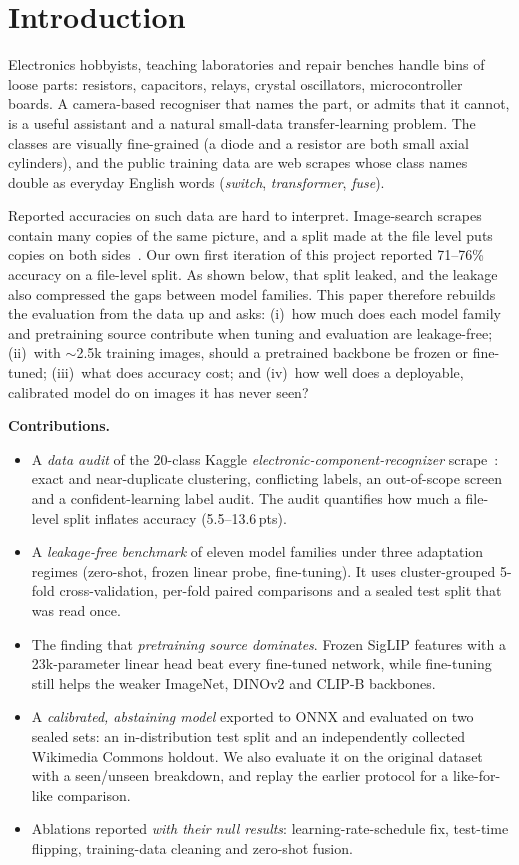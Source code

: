\documentclass[conference]{IEEEtran}
\newcommand{\pts}{\,pts}
\begin{document}
\section{Introduction}
Electronics hobbyists, teaching laboratories and repair benches handle bins of loose parts: resistors, capacitors,
relays, crystal oscillators, microcontroller boards. A camera-based recogniser that names the part, or admits that it
cannot, is a useful assistant and a natural small-data transfer-learning problem. The classes are visually
fine-grained (a diode and a resistor are both small axial cylinders), and the public training data are web scrapes
whose class names double as everyday English words (\emph{switch}, \emph{transformer}, \emph{fuse}).

Reported accuracies on such data are hard to interpret. Image-search scrapes contain many copies of the same picture,
and a split made at the file level puts copies on both sides~\cite{barz2020cifair,kapoor2023leakage}. Our own first
iteration of this project reported 71--76\% accuracy on a file-level split. As shown below, that split leaked, and the
leakage also compressed the gaps between model families. This paper therefore rebuilds the evaluation from the data up
and asks: (i)~how much does each model family and pretraining source contribute when tuning and evaluation are
leakage-free; (ii)~with ${\sim}$2.5k training images, should a pretrained backbone be frozen or fine-tuned;
(iii)~what does accuracy cost; and (iv)~how well does a deployable, calibrated model do on images it has never seen?

\textbf{Contributions.}
\begin{itemize}
\item A \emph{data audit} of the 20-class Kaggle \emph{electronic-component-recognizer} scrape~\cite{kaggle_dataset}:
exact and near-duplicate clustering, conflicting labels, an out-of-scope screen and a confident-learning label audit.
The audit quantifies how much a file-level split inflates accuracy (5.5--13.6\pts).
\item A \emph{leakage-free benchmark} of eleven model families under three adaptation regimes (zero-shot, frozen
linear probe, fine-tuning). It uses cluster-grouped 5-fold cross-validation, per-fold paired comparisons and a
sealed test split that was read once.
\item The finding that \emph{pretraining source dominates}. Frozen SigLIP features with a 23k-parameter linear head
beat every fine-tuned network, while fine-tuning still helps the weaker ImageNet, DINOv2 and CLIP-B backbones.
\item A \emph{calibrated, abstaining model} exported to ONNX and evaluated on two sealed sets: an in-distribution test
split and an independently collected Wikimedia Commons holdout. We also evaluate it on the original dataset with a
seen/unseen breakdown, and replay the earlier protocol for a like-for-like comparison.
\item Ablations reported \emph{with their null results}: learning-rate-schedule fix, test-time flipping,
training-data cleaning and zero-shot fusion.
\end{itemize}
\end{document}
